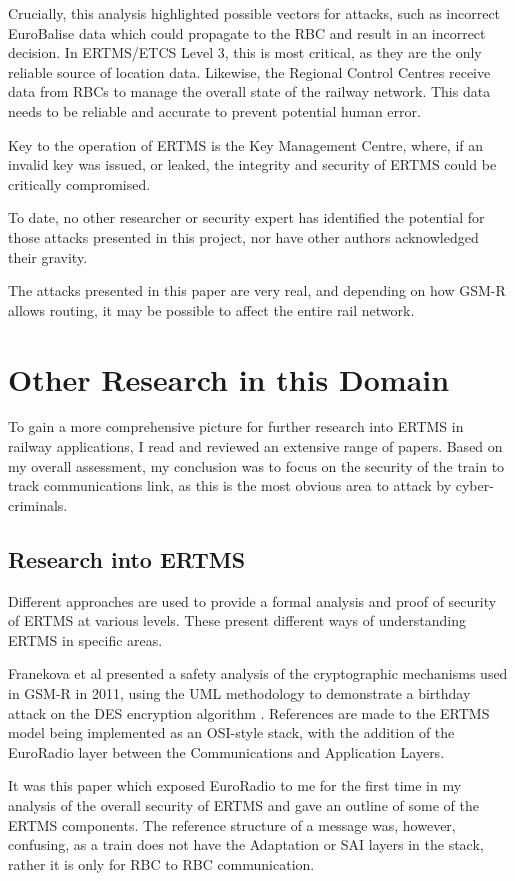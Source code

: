 \documentclass[twoside,11pt,a4paper]{article}
\begin{document}
Crucially, this analysis highlighted possible vectors for attacks, such as incorrect EuroBalise data which could propagate to the RBC and result in an incorrect decision. In ERTMS/ETCS Level 3, this is most critical, as they are the only reliable source of location data. Likewise, the Regional Control Centres receive data from RBCs to manage the overall state of the railway network. This data needs to be reliable and accurate to prevent potential human error.

Key to the operation of ERTMS is the Key Management Centre, where, if an invalid key was issued, or leaked, the integrity and security of ERTMS could be critically compromised.

To date, no other researcher or security expert has identified the potential for those attacks presented in this project, nor have other authors acknowledged their gravity.

The attacks presented in this paper are very real, and depending on how GSM-R allows routing, it may be possible to affect the entire rail network.
\clearpage

\section{Other Research in this Domain}
To gain a more comprehensive picture for further research into ERTMS in railway applications, I read and reviewed an extensive range of papers. Based on my overall assessment, my conclusion was to focus on the security of the train to track communications link, as this is the most obvious area to attack by cyber-criminals.
\subsection{Research into ERTMS}
Different approaches are used to provide a formal analysis and proof of security of ERTMS at various levels. These present different ways of understanding ERTMS in specific areas.

Franekova et al presented a safety analysis of the cryptographic mechanisms used in {GSM-R} in 2011, using the UML methodology to demonstrate a birthday attack on the DES encryption algorithm \citep{Franekova11a}. References are made to the ERTMS model being implemented as an OSI-style stack, with the addition of the EuroRadio layer between the Communications and Application Layers.

It was this paper which exposed EuroRadio to me for the first time in my analysis of the overall security of ERTMS and gave an outline of some of the ERTMS components. The reference structure of a message was, however, confusing, as a train does not have the Adaptation or SAI layers in the stack, rather it is only for RBC to RBC communication.
\end{document}
